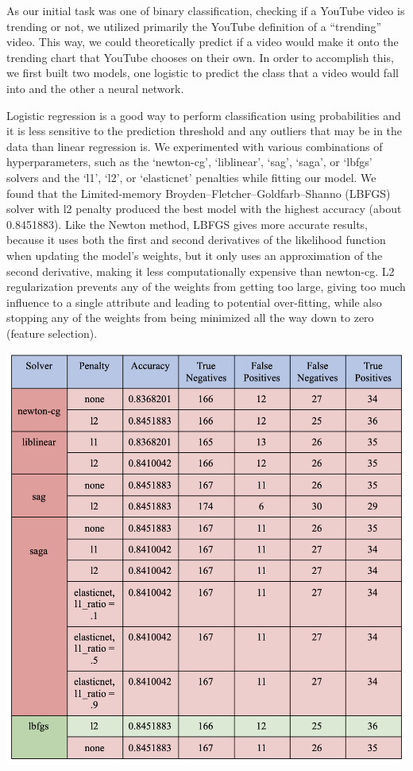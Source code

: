 \documentclass{article}
\begin{document}
\quad As our initial task was one of binary classification, checking if a YouTube video is trending or not, we utilized primarily the YouTube definition of a “trending” video. This way, we could theoretically predict if a video would make it onto the trending chart that YouTube chooses on their own. In order to accomplish this, we first built two models, one logistic to predict the class that a video would fall into and the other a neural network.
\par Logistic regression is a good way to perform classification using probabilities and it is less sensitive to the prediction threshold and any outliers that may be in the data than linear regression is. We experimented with various combinations of hyperparameters, such as the ‘newton-cg’, ‘liblinear’, ‘sag’, ‘saga’, or ‘lbfgs’ solvers and the ‘l1’, ‘l2’, or ‘elasticnet’ penalties while fitting our model.  We found that the Limited-memory Broyden–Fletcher–Goldfarb–Shanno (LBFGS) solver with l2 penalty produced the best model with the highest accuracy (about 0.8451883).  Like the Newton method, LBFGS gives more accurate results, because it uses both the first and second derivatives of the likelihood function when updating the model’s weights, but it only uses an approximation of the second derivative, making it less computationally expensive than newton-cg.  L2 regularization prevents any of the weights from getting too large, giving too much influence to a single attribute and leading to potential over-fitting, while also stopping any of the weights from being minimized all the way down to zero (feature selection).

\begin{center}
\includegraphics[scale=.5]{solver_results.png}\\
\end{center}
\end{document}
